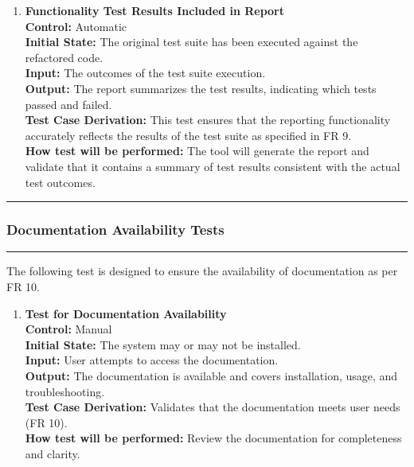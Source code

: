 \documentclass[12pt, titlepage]{article}
\newcommand{\colorrule}{\textcolor{BlueViolet}{\rule{\linewidth}{2pt}}}
\begin{document}
\begin{enumerate}[label={\bf \textcolor{Maroon}{test-FR-RP-\arabic*}}, wide=0pt, font=\itshape]
  \item \textbf{Functionality Test Results Included in Report}\\[2mm]
    \textbf{Control:} Automatic \\
    \textbf{Initial State:} The original test suite has been executed against the refactored code.\\
    \textbf{Input:} The outcomes of the test suite execution.\\
    \textbf{Output:} The report summarizes the test results, indicating which tests passed and failed.\\[2mm]
    \textbf{Test Case Derivation:} This test ensures that the reporting functionality accurately reflects the results of the test suite as specified in FR 9.\\[2mm]
    \textbf{How test will be performed:} The tool will generate the report and validate that it contains a summary of test results consistent with the actual test outcomes.
\end{enumerate}

\noindent
\colorrule

\subsubsection{Documentation Availability Tests}
\colorrule

\medskip

\noindent
The following test is designed to ensure the availability of documentation as per FR 10.

\begin{enumerate}[label={\bf \textcolor{Maroon}{test-FR-DA-\arabic*}}, wide=0pt, font=\itshape]
  \item \textbf{Test for Documentation Availability}\\[2mm]
    \textbf{Control:} Manual\\
    \textbf{Initial State:} The system may or may not be installed.\\
    \textbf{Input:} User attempts to access the documentation.\\
    \textbf{Output:} The documentation is available and covers installation, usage, and troubleshooting.\\[2mm]
    \textbf{Test Case Derivation:} Validates that the documentation meets user needs (FR 10).\\[2mm]
    \textbf{How test will be performed:} Review the documentation for completeness and clarity.
\end{enumerate}
\end{document}
